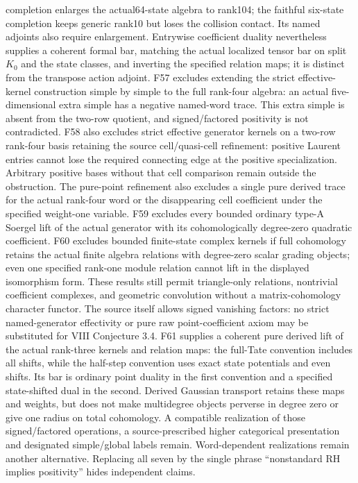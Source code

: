 \documentclass[11pt,a4paper]{article}
\theoremstyle{named}\newtheorem{finding}{Finding}[section]
\theoremstyle{definition}\newtheorem{definition}[finding]{Definition}
\theoremstyle{remark}\newtheorem{remark}[finding]{Remark}
\begin{document}
completion enlarges the actual64-state algebra to rank104; the faithful six-state completion keeps generic rank10 but loses the collision contact. Its named adjoints also require enlargement. Entrywise coefficient duality nevertheless supplies a coherent formal bar, matching the actual localized tensor bar on split $K_0$ and the state classes, and inverting the specified relation maps; it is distinct from the transpose action adjoint. F57 excludes extending the strict effective-kernel construction simple by simple to the full rank-four algebra: an actual five-dimensional extra simple has a negative named-word trace. This extra simple is absent from the two-row quotient, and signed/factored positivity is not contradicted. F58 also excludes strict effective generator kernels on a two-row rank-four basis retaining the source cell/quasi-cell refinement: positive Laurent entries cannot lose the required connecting edge at the positive specialization. Arbitrary positive bases without that cell comparison remain outside the obstruction. The pure-point refinement also excludes a single pure derived trace for the actual rank-four word or the disappearing cell coefficient under the specified weight-one variable. F59 excludes every bounded ordinary type-A Soergel lift of the actual generator with its cohomologically degree-zero quadratic coefficient. F60 excludes bounded finite-state complex kernels if full cohomology retains the actual finite algebra relations with degree-zero scalar grading objects; even one specified rank-one module relation cannot lift in the displayed isomorphism form. These results still permit triangle-only relations, nontrivial coefficient complexes, and geometric convolution without a matrix-cohomology character functor. The source itself allows signed vanishing factors: no strict named-generator effectivity or pure raw point-coefficient axiom may be substituted for VIII Conjecture 3.4. F61 supplies a coherent pure derived lift of the actual rank-three kernels and relation maps: the full-Tate convention includes all shifts, while the half-step convention uses exact state potentials and even shifts. Its bar is ordinary point duality in the first convention and a specified state-shifted dual in the second. Derived Gaussian transport retains these maps and weights, but does not make multidegree objects perverse in degree zero or give one radius on total cohomology. A compatible realization of those signed/factored operations, a source-prescribed higher categorical presentation and designated simple/global labels remain. Word-dependent realizations remain another alternative. Replacing all seven by the single phrase ``nonstandard RH implies positivity'' hides independent claims.
\end{document}
